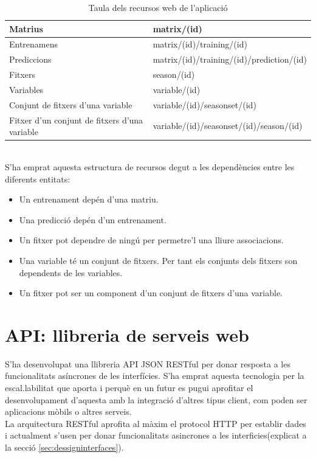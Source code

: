 \begin{table}[ht]
\begin{tabular}{| p{5cm} | p{10cm} |}
\hline
Matrius     & matrix/(id) \\ \hline
Entrenamens & matrix/(id)/training/(id) \\ \hline
Prediccions & matrix/(id)/training/(id)/prediction/(id) \\ \hline
Fitxers 	& season/(id) \\ \hline
Variables	& variable/(id) \\ \hline
Conjunt de fitxers d'una variable & variable/(id)/seasonset/(id) \\ \hline
Fitxer d'un conjunt de fitxers d'una variable & variable/(id)/seasonset/(id)/season/(id) \\ \hline
\end{tabular}
\caption{Taula dels recursos web de l'aplicació}
\end{table}
\\

S'ha emprat aquesta estructura de recursos degut a les dependències entre les diferents entitats:
\begin{itemize}
\item Un entrenament dep\'{e}n d'una matriu.
\item Una predicci\'{o} dep\'{e}n d'un entrenament.
\item Un fitxer pot dependre de ningú per permetre'l una lliure associacions.
\item Una variable t\'{e} un conjunt de fitxers. Per tant els conjunts dels fitxers son dependents de les variables.
\item Un fitxer pot ser un component d'un conjunt de fitxers d'una variable.
\end{itemize}

\section{API: llibreria de serveis web}
S'ha desenvolupat una llibreria API JSON RESTful per donar resposta a les funcionalitats asíncrones de les interfícies.\cite{apijson} S'ha emprat aquesta tecnologia per la escal.labilitat que aporta i perquè en un futur es pugui aprofitar el desenvolupament d'aquesta amb la integració d'altres tipus client, com poden ser aplicacions mòbils o altres serveis.\\

La arquitectura RESTful aprofita al màxim el protocol HTTP per establir dades i actualment s'usen per donar funcionalitats asincrones a les interficies(explicat a la secció \ref{sec:dessigninterfaces}).

